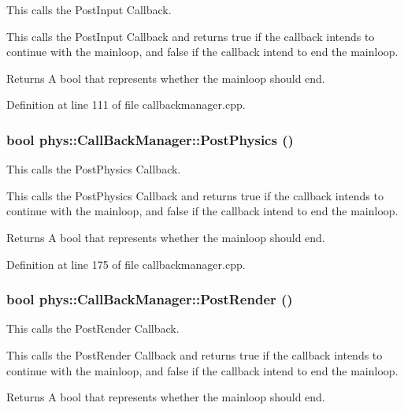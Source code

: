 This calls the PostInput Callback. 

This calls the PostInput Callback and returns true if the callback intends to continue with the mainloop, and false if the callback intend to end the mainloop. \begin{DoxyReturn}{Returns}
A bool that represents whether the mainloop should end. 
\end{DoxyReturn}


Definition at line 111 of file callbackmanager.cpp.

\hypertarget{classphys_1_1CallBackManager_a06bf0e8787f21caf31bf428727155084}{
\subsubsection[{PostPhysics}]{\setlength{\rightskip}{0pt plus 5cm}bool phys::CallBackManager::PostPhysics ()}}
\label{d1/d47/classphys_1_1CallBackManager_a06bf0e8787f21caf31bf428727155084}


This calls the PostPhysics Callback. 

This calls the PostPhysics Callback and returns true if the callback intends to continue with the mainloop, and false if the callback intend to end the mainloop. \begin{DoxyReturn}{Returns}
A bool that represents whether the mainloop should end. 
\end{DoxyReturn}


Definition at line 175 of file callbackmanager.cpp.

\hypertarget{classphys_1_1CallBackManager_aa1a1132e877d989ecea08a16ee4b3ac1}{
\subsubsection[{PostRender}]{\setlength{\rightskip}{0pt plus 5cm}bool phys::CallBackManager::PostRender ()}}
\label{d1/d47/classphys_1_1CallBackManager_aa1a1132e877d989ecea08a16ee4b3ac1}


This calls the PostRender Callback. 

This calls the PostRender Callback and returns true if the callback intends to continue with the mainloop, and false if the callback intend to end the mainloop. \begin{DoxyReturn}{Returns}
A bool that represents whether the mainloop should end. 
\end{DoxyReturn}


